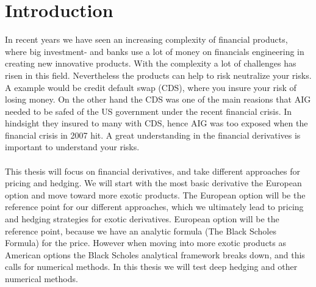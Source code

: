 
\chapter{Introduction} %

\label{Chapter1} %

In recent years we have seen an increasing complexity of financial products, where big investment- and banks use a lot of money on financials engineering in creating new innovative products. With the complexity a lot of challenges has risen in this field. Nevertheless the products can help to risk neutralize your risks. A example would be credit default swap (CDS), where you insure your risk of losing money. On the other hand the CDS was one of the main reasions that AIG needed to be safed of the US government under the recent financial crisis. In hindsight they insured to many with CDS, hence AIG was too exposed when the financial crisis in 2007 hit. A great understanding in the financial derivatives is important to understand your risks.
\parencite{Zucchi}\\
\\
This thesis will focus on financial derivatives, and take different approaches for pricing and hedging. We will start with the most basic derivative the European option and move toward more exotic products. The European option will be the reference point for our different approaches, which we ultimately lead to pricing and hedging strategies for exotic derivatives. European option will be the reference point, because we have an analytic formula (The Black Scholes Formula) for the price. However when moving into more exotic products as American options the Black Scholes analytical framework breaks down, and this calls for numerical methods. In this thesis we will test deep hedging and other numerical methods.